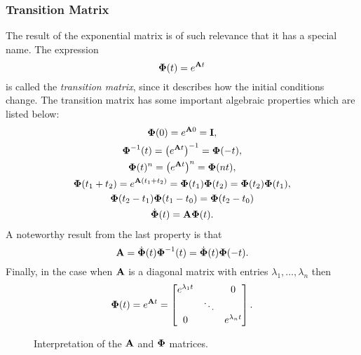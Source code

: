 \subsubsection{Transition Matrix}

The result of the exponential matrix is of such relevance that it has a special name. The expression
\[
	\bm{\mathrm{\Phi}}(t) = e^{\bm{\mathrm{A}} t}
\]
is called the \emph{transition matrix}, since it describes how the initial conditions change. The transition matrix has some important algebraic properties which are listed below:
\begin{gather*}
	\bm{\mathrm{\Phi}}(0)
		= e^{\bm{\mathrm{A}} 0}
		= \bm{\mathrm{I}}, \\
	\bm{\mathrm{\Phi}}^{-1}(t)
		= \left(e^{\bm{\mathrm{A}}t}\right)^{-1}
		= \bm{\mathrm{\Phi}}(-t), \\
	\bm{\mathrm{\Phi}}(t)^{n}
		= \left(e^{\bm{\mathrm{A}}t}\right)^{n}
		= \bm{\mathrm{\Phi}}(nt), \\
	\bm{\mathrm{\Phi}}(t_1 + t_2)
		= e^{\bm{\mathrm{A}}(t_1 + t_2)}
		= \bm{\mathrm{\Phi}}(t_1) \bm{\mathrm{\Phi}}(t_2)
		= \bm{\mathrm{\Phi}}(t_2) \bm{\mathrm{\Phi}}(t_1), \\
	\bm{\mathrm{\Phi}}(t_2 - t_1) \bm{\mathrm{\Phi}}(t_1 - t_0)
		= \bm{\mathrm{\Phi}}(t_2 - t_0)
		\\
	\dot{\bm{\mathrm{\Phi}}}(t) = \bm{\mathrm{A}}\bm{\mathrm{\Phi}}(t)
	.
\end{gather*}
A noteworthy result from the last property is that
\[
	\bm{\mathrm{A}} = \dot{\bm{\mathrm{\Phi}}}(t) \bm{\mathrm{\Phi}}^{-1}(t)
	= \dot{\bm{\mathrm{\Phi}}}(t) \bm{\mathrm{\Phi}}(-t).
\]
Finally, in the case when \(\bm{\mathrm{A}}\) is a diagonal matrix with entries \(\lambda_1, \ldots, \lambda_n\) then
\[
	\bm{\mathrm{\Phi}}(t) = e^{\bm{\mathrm{A}} t} = \begin{bmatrix}
		e^{\lambda_1 t} & & 0 \\
		& \ddots \\
		0 & & e^{\lambda_n t}
	\end{bmatrix}.
\]

\begin{figure}
	\centering
	\caption{
		Interpretation of the \(\bm{\mathrm{A}}\) and \(\bm{\mathrm{\Phi}}\) matrices.
		\label{fig:ss-matrix-interp}
	}
\end{figure}

